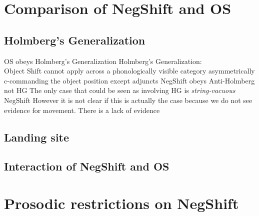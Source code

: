 \documentclass[12pt, letterpaper]{article}
\begin{document}



\section{Comparison of NegShift and OS} \label{sec:Comparison}

\subsection{Holmberg's Generalization} \label{sec:HG}
\ea OS obeys Holmberg's Generalization 
\ex Holmberg's Generalization:\\
Object Shift cannot apply across a phonologically visible category asymmetrically c-commanding the object position except adjuncts 
\ex NegShift obeys Anti-Holmberg not HG
\ex The only case that could be seen as involving HG is \emph{string-vacuous} NegShift
	\ea However it is not clear if this is actually the case because we do not see evidence for movement. 
	\ex There is a lack of evidence  
	\z 
\z

\subsection{Landing site} \label{sec:Landing}
\ea 
\z

\subsection{Interaction of NegShift and OS} \label{sec:NEG-OS}
\ea 
\z

\section{Prosodic restrictions on NegShift} \label{sec:PROSODY}
\end{document}
